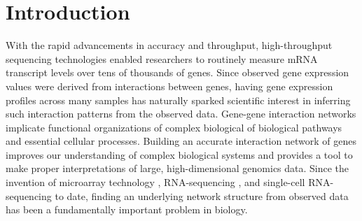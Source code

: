 \documentclass[a4paper]{article}
\begin{document}
\section{Introduction}

With the rapid advancements in accuracy and throughput, high-throughput sequencing technologies enabled researchers to routinely measure mRNA transcript levels over tens of thousands of genes. Since observed gene expression values were derived from interactions between genes, having gene expression profiles across many samples has naturally sparked scientific interest in inferring such interaction patterns from the observed data. Gene-gene interaction networks implicate functional organizations of complex biological of biological pathways and essential cellular processes. Building an accurate interaction network of genes improves our understanding of complex biological systems and provides a tool to make proper interpretations of large, high-dimensional genomics data. Since the invention of microarray technology \cite{schena1995quantitative}, RNA-sequencing \cite{wang2009rna}, and single-cell RNA-sequencing \cite{macosko2015highly} to date, finding an underlying network structure from observed data has been a fundamentally important problem in biology.



\end{document}
